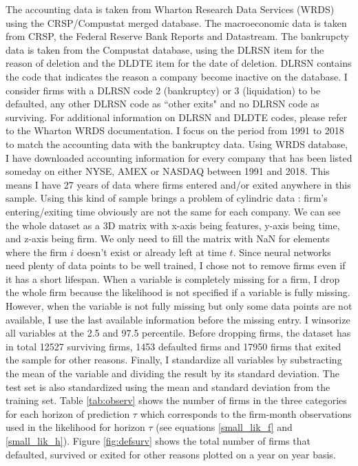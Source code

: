 The accounting data is taken from Wharton Research Data Services (WRDS) using the CRSP/Compustat merged database. The macroeconomic data is taken from CRSP, the Federal Reserve Bank Reports and Datastream. The bankrupcty data is taken from the Compustat database, using the DLRSN item for the reason of deletion and the DLDTE item for the date of deletion. DLRSN contains the code that indicates the reason a company become inactive on the database. I consider firms with a DLRSN code 2 (bankruptcy) or 3 (liquidation) to be defaulted, any other DLRSN code as ``other exits" and no DLRSN code as surviving. For additional information on DLRSN and DLDTE codes, please refer to the Wharton WRDS documentation. I focus on the period from 1991 to 2018 to match the accounting data with the bankruptcy data. Using WRDS database, I have downloaded accounting information for every company that has been listed someday on either NYSE, AMEX or NASDAQ between 1991 and 2018. This means I have 27 years of data where firms entered and/or exited anywhere in this sample. Using this kind of sample brings a problem of cylindric data : firm's entering/exiting time obviously are not the same for each company. We can see the whole dataset as a 3D matrix with x-axis being features, y-axis being time, and z-axis being firm. We only need to fill the matrix with NaN for elements where the firm $i$ doesn't exist or already left at time $t$. 
Since neural networks need plenty of data points to be well trained, I chose not to remove firms even if it has a short lifespan. When a variable is completely missing for a firm, I drop the whole firm because the likelihood is not specified if a variable is fully missing. However, when the variable is not fully missing but only some data points are not available, I use the last available information before the missing entry. I winsorize all variables at the 2.5 and 97.5 percentile. Before dropping firms, the dataset has in total 12527 surviving firms, 1453 defaulted firms and 17950 firms that exited the sample for other reasons. Finally, I standardize all variables by substracting the mean of the variable and dividing the result by its standard deviation. The test set is also standardized using the mean and standard deviation from the training set. Table \ref{tab:observ} shows the number of firms in the three categories for each horizon of prediction $\tau$ which corresponds to the firm-month observations used in the likelihood for horizon $\tau$ (see equations \ref{small_lik_f} and \ref{small_lik_h}). Figure \ref{fig:defsurv} shows the total number of firms that defaulted, survived or exited for other reasons plotted on a year on year basis.

